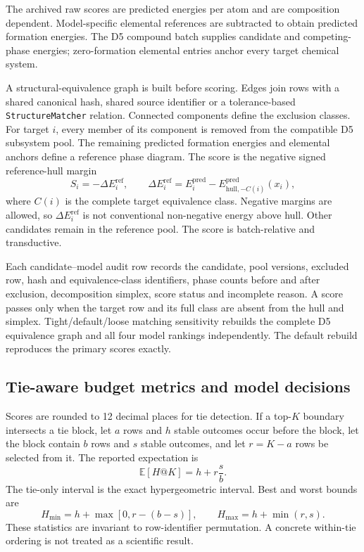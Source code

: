 \documentclass[twoside,twocolumn,9pt]{article}
\begin{document}
The archived raw scores are predicted energies per atom and are composition dependent. Model-specific elemental references are subtracted to obtain predicted formation energies. The D5 compound batch supplies candidate and competing-phase energies; zero-formation elemental entries anchor every target chemical system.

A structural-equivalence graph is built before scoring. Edges join rows with a shared canonical hash, shared source identifier or a tolerance-based \texttt{StructureMatcher} relation. Connected components define the exclusion classes. For target $i$, every member of its component is removed from the compatible D5 subsystem pool. The remaining predicted formation energies and elemental anchors define a reference phase diagram. The score is the negative signed reference-hull margin
\[
S_i=-\Delta E_i^{\mathrm{ref}},\qquad
\Delta E_i^{\mathrm{ref}}=E_i^{\mathrm{pred}}-E_{\mathrm{hull},-C(i)}^{\mathrm{pred}}(x_i),
\]
where $C(i)$ is the complete target equivalence class. Negative margins are allowed, so $\Delta E_i^{\mathrm{ref}}$ is not conventional non-negative energy above hull. Other candidates remain in the reference pool. The score is batch-relative and transductive.

Each candidate--model audit row records the candidate, pool versions, excluded row, hash and equivalence-class identifiers, phase counts before and after exclusion, decomposition simplex, score status and incomplete reason. A score passes only when the target row and its full class are absent from the hull and simplex. Tight/default/loose matching sensitivity rebuilds the complete D5 equivalence graph and all four model rankings independently. The default rebuild reproduces the primary scores exactly.

\subsection{Tie-aware budget metrics and model decisions}

Scores are rounded to 12 decimal places for tie detection. If a top-$K$ boundary intersects a tie block, let $a$ rows and $h$ stable outcomes occur before the block, let the block contain $b$ rows and $s$ stable outcomes, and let $r=K-a$ rows be selected from it. The reported expectation is
\[
\mathbb{E}[H@K]=h+r\frac{s}{b}.
\]
The tie-only interval is the exact hypergeometric interval. Best and worst bounds are
\[
H_{\min}=h+\max[0,r-(b-s)],\qquad
H_{\max}=h+\min(r,s).
\]
These statistics are invariant to row-identifier permutation. A concrete within-tie ordering is not treated as a scientific result.
\end{document}
